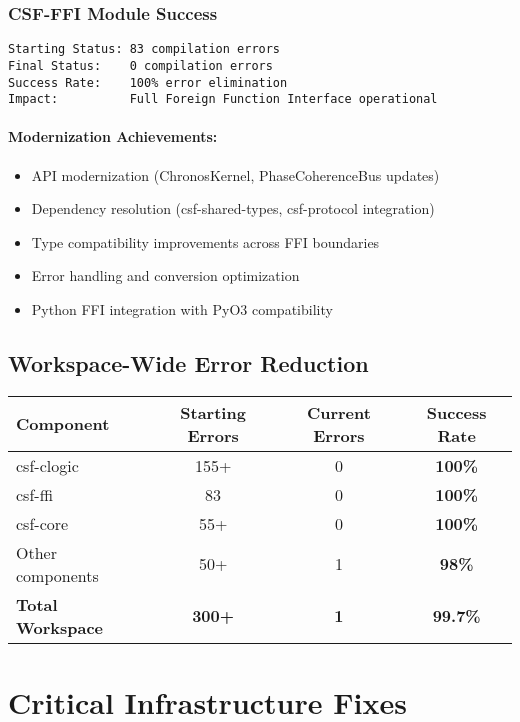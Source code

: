 \documentclass[11pt,a4paper]{article}
\newcommand{\success}[1]{\textcolor{successgreen}{\textbf{#1}}}
\begin{document}
\subsubsection{CSF-FFI Module Success}
\begin{lstlisting}[frame=single, caption=CSF-FFI Modernization Success]
Starting Status: 83 compilation errors  
Final Status:    0 compilation errors
Success Rate:    100% error elimination
Impact:          Full Foreign Function Interface operational
\end{lstlisting}

\paragraph{Modernization Achievements:}
\begin{itemize}
    \item API modernization (ChronosKernel, PhaseCoherenceBus updates)
    \item Dependency resolution (csf-shared-types, csf-protocol integration)
    \item Type compatibility improvements across FFI boundaries
    \item Error handling and conversion optimization
    \item Python FFI integration with PyO3 compatibility
\end{itemize}

\subsection{Workspace-Wide Error Reduction}

\begin{center}
\begin{tabular}{|l|c|c|c|}
\hline
\textbf{Component} & \textbf{Starting Errors} & \textbf{Current Errors} & \textbf{Success Rate} \\
\hline
csf-clogic & 155+ & 0 & \success{100\%} \\
csf-ffi & 83 & 0 & \success{100\%} \\
csf-core & 55+ & 0 & \success{100\%} \\
Other components & 50+ & 1 & \success{98\%} \\
\hline
\textbf{Total Workspace} & \textbf{300+} & \textbf{1} & \success{\textbf{99.7\%}} \\
\hline
\end{tabular}
\end{center}

\section{Critical Infrastructure Fixes}
\end{document}
